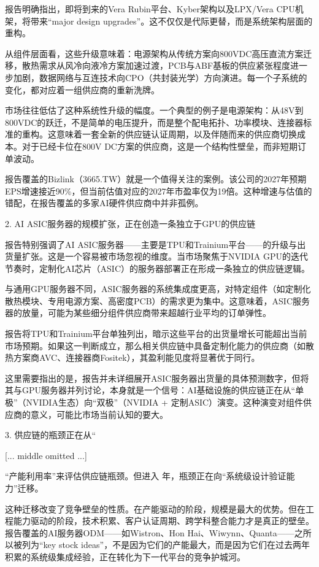 \documentclass[11pt]{ctexart}
\begin{document}
报告明确指出，即将到来的Vera Rubin平台、Kyber架构以及LPX/Vera CPU机架，将带来“major design upgrades”。这不仅仅是代际更替，而是系统架构层面的重构。

从组件层面看，这些升级意味着：电源架构从传统方案向800VDC高压直流方案迁移，散热需求从风冷向液冷方案加速过渡，PCB与ABF基板的供应紧张程度进一步加剧，数据网络与互连技术向CPO（共封装光学）方向演进。每一个子系统的变化，都对应着一组供应商的重新洗牌。

市场往往低估了这种系统性升级的幅度。一个典型的例子是电源架构：从48V到800VDC的跃迁，不是简单的电压提升，而是整个配电拓扑、功率模块、连接器标准的重构。这意味着一套全新的供应链认证周期，以及伴随而来的供应商切换成本。对于已经卡位在800V DC方案的供应商，这是一个结构性壁垒，而非短期订单波动。

报告覆盖的Bizlink（3665.TW）就是一个值得关注的案例。该公司的2027年预期EPS增速接近90\%，但当前估值对应的2027年市盈率仅为19倍。这种增速与估值的错配，在报告覆盖的多家AI硬件供应商中并非孤例。

2. AI ASIC服务器的规模扩张，正在创造一条独立于GPU的供应链

报告特别强调了AI ASIC服务器——主要是TPU和Trainium平台——的升级与出货量扩张。这是一个容易被市场忽视的维度。当市场聚焦于NVIDIA GPU的迭代节奏时，定制化AI芯片（ASIC）的服务器部署正在形成一条独立的供应链逻辑。

与通用GPU服务器不同，ASIC服务器的系统集成度更高，对特定组件（如定制化散热模块、专用电源方案、高密度PCB）的需求更为集中。这意味着，ASIC服务器的放量，可能为某些细分组件供应商带来超越行业平均的订单弹性。

报告将TPU和Trainium平台单独列出，暗示这些平台的出货量增长可能超出当前市场预期。如果这一判断成立，那么相关供应链中具备定制化能力的供应商（如散热方案商AVC、连接器商Fositek），其盈利能见度将显著优于同行。

这里需要指出的是，报告并未详细展开ASIC服务器出货量的具体预测数字，但将其与GPU服务器并列讨论，本身就是一个信号：AI基础设施的供应链正在从“单极”（NVIDIA生态）向“双极”（NVIDIA + 定制ASIC）演变。这种演变对组件供应商的意义，可能比市场当前认知的要大。

3. 供应链的瓶颈正在从“

[... middle omitted ...]

“产能利用率”来评估供应链瓶颈。但进入 年，瓶颈正在向“系统级设计验证能力”迁移。

这种迁移改变了竞争壁垒的性质。在产能驱动的阶段，规模是最大的优势。但在工程能力驱动的阶段，技术积累、客户认证周期、跨学科整合能力才是真正的壁垒。报告覆盖的AI服务器ODM——如Wistron、Hon Hai、Wiwynn、Quanta——之所以被列为“key stock ideas”，不是因为它们的产能最大，而是因为它们在过去两年积累的系统级集成经验，正在转化为下一代平台的竞争护城河。
\end{document}
